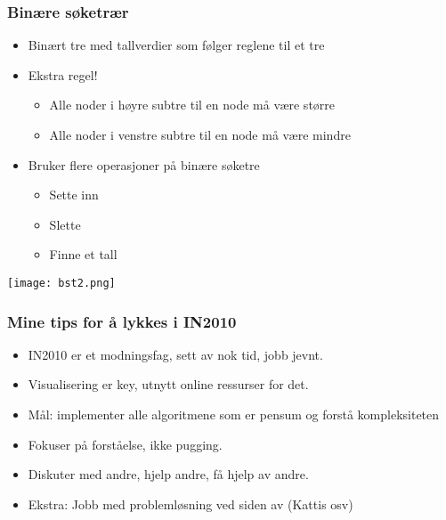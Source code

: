 \documentclass[norsk]{beamer}
\begin{document}
    \begin{frame}
        \frametitle{Binære søketrær}
        \begin{itemize}
            \item Binært tre med tallverdier som følger reglene til et tre
            \item Ekstra regel!
            \begin{itemize}
                \item Alle noder i høyre subtre til en node må være større
                \item Alle noder i venstre subtre til en node må være mindre
            \end{itemize}
            \item Bruker flere operasjoner på binære søketre
                \begin{itemize}
                    \item Sette inn
                    \item Slette
                    \item Finne et tall
                \end{itemize}
        \end{itemize}

    \end{frame}

    \begin{frame}
        \texttt{[image: bst2.png]}
    \end{frame}

    \begin{frame}
        \frametitle{Mine tips for å lykkes i IN2010}
        \begin{itemize}
            \item IN2010 er et modningsfag, sett av nok tid, jobb jevnt.
            \item Visualisering er key, utnytt online ressurser for det.
            \item Mål: implementer alle algoritmene som er pensum og forstå kompleksiteten
            \item Fokuser på forståelse, ikke pugging.
            \item Diskuter med andre, hjelp andre, få hjelp av andre.
            \item Ekstra: Jobb med problemløsning ved siden av (Kattis osv)
        \end{itemize}
    \end{frame}
\end{document}
